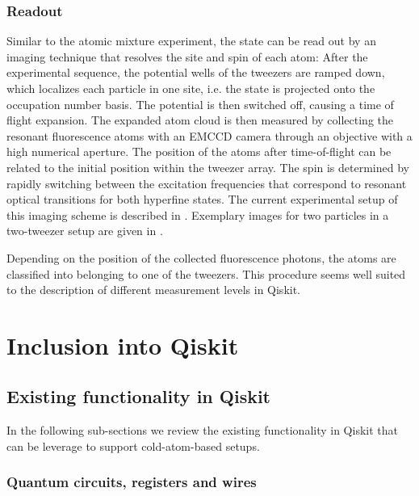 \documentclass[a4paper, 10pt]{article}
\begin{document}
    \subsubsection{Readout}
    
    Similar to the atomic mixture experiment, the state can be read out by an imaging technique that resolves the site and spin of each atom: After the experimental sequence, the potential wells of the tweezers are ramped down, which localizes each particle in one site, i.e. the state is projected onto the occupation number basis.
    The potential is then switched off, causing a time of flight expansion.
    The expanded atom cloud is then measured by collecting the resonant fluorescence atoms with an EMCCD camera through an objective with a high numerical aperture.
    The position of the atoms after time-of-flight can be related to the initial position within the tweezer array.
    The spin is determined by rapidly switching between the excitation frequencies that correspond to resonant optical transitions for both hyperfine states.
    The current experimental setup of this imaging scheme is described in \cite{bergschneider2018spin}.
    Exemplary images for two particles in a two-tweezer setup are given in \cite{bergschneider2019experimental}.
    
    Depending on the position of the collected fluorescence photons, the atoms are classified into belonging to one of the tweezers.
    This procedure seems well suited to the description of different measurement levels in Qiskit. 
    
\newpage
        
\section{Inclusion into Qiskit}
    
    \subsection{Existing functionality in Qiskit}
    
    In the following sub-sections we review the existing functionality in Qiskit that can be leverage to support cold-atom-based setups.
    
    \subsubsection{Quantum circuits, registers and wires}
    
\end{document}

